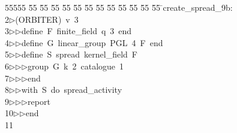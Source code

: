 %
%
\begin{tabbing}
55555 \= 55 \= 55 \= 55 \= 55 \= 55 \= 55 \= 55 \= 55 \= 55 \= 55 \= 55 \= 55 \= \>create\_spread\_9b:\\[0pt]
2\>$\triangleright$\>(ORBITER)\ v\ 3\ \\[0pt]
3\>$\triangleright$\>$\triangleright$\>define\ F\ finite\_field\ q\ 3\ end\ \\[0pt]
4\>$\triangleright$\>$\triangleright$\>define\ G\ linear\_group\ PGL\ 4\ F\ end\ \\[0pt]
5\>$\triangleright$\>$\triangleright$\>define\ S\ spread\ kernel\_field\ F\ \\[0pt]
6\>$\triangleright$\>$\triangleright$\>$\triangleright$\>group\ G\ k\ 2\ catalogue\ 1\ \\[0pt]
7\>$\triangleright$\>$\triangleright$\>$\triangleright$\>end\ \\[0pt]
8\>$\triangleright$\>$\triangleright$\>with\ S\ do\ spread\_activity\ \\[0pt]
9\>$\triangleright$\>$\triangleright$\>$\triangleright$\>report\ \\[0pt]
10\>$\triangleright$\>$\triangleright$\>end\\[0pt]
11\>\end{tabbing}
